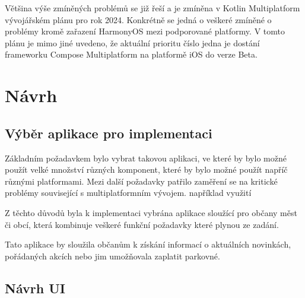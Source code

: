 Většina výše zmíněných problémů se již řeší a je zmíněna v Kotlin Multiplatform vývojářském plánu pro rok 2024. \cite{KMPRoaddMap} Konkrétně
se jedná o veškeré zmíněné o problémy kromě zařazení HarmonyOS mezi podporované platformy.%
V tomto plánu je mimo jiné uvedeno, že aktuální prioritu číslo jedna je dostání frameworku Compose Multiplatform na platformě iOS do verze Beta. \cite{KMPRoaddMap}

\chapter{Návrh}



\section{Výběr aplikace pro implementaci}
Základním požadavkem bylo vybrat takovou aplikaci, ve které by bylo možné použít velké množství různých komponent, 
které by bylo možné použít napříč různými platformami.
Mezi další požadavky patřilo zaměření se na kritické problémy související s multiplatformním vývojem. 
například využití 

Z těchto důvodů byla k implementaci vybrána aplikace sloužící pro občany měst či obcí, která kombinuje veškeré funkční
požadavky které plynou ze zadání.

Tato aplikace by sloužila občanům k získání informací o aktuálních novinkách, pořádaných akcích nebo jim umožňovala
zaplatit parkovné.



\section{Návrh UI}

